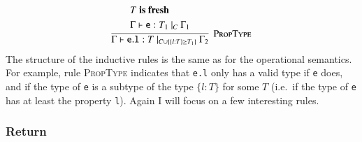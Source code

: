 \documentclass[12pt,a4paper,twoside,openright]{report}
\theoremstyle{definition}
\theoremstyle{dotless}
\newcommand*{\js}{\texttt}
\begin{document}
$$\infer[\textsc{PropType}]{
  \Gamma \vdash \mathtt{e.l}:T\ |_{C\cup\{\{l:T\}\succeq T_1\}}\ \Gamma_2
}{\begin{split}
	&T \textbf{ is fresh} \\
	&\Gamma\vdash\mathtt{e}:T_1\ |_C\ \Gamma_1
  \end{split}}$$
The structure of the inductive rules is the same as for the operational
semantics. For example, rule \textsc{PropType} indicates that \js{e.l} only
has a valid type if \js{e} does, and if the type of \js{e} is a subtype
of the type $\{l: T\}$ for some $T$ (i.e.~if the type of \js{e} has at least the property
\js{l}). Again I will focus on a few interesting rules.

\subsubsection*{Return}
\end{document}
